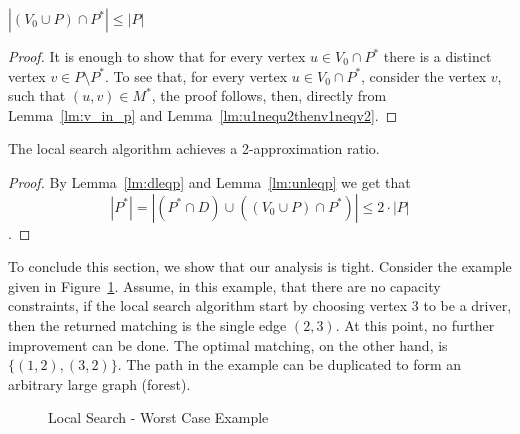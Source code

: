 \begin{lemma}
\label{lm:unleqp}
$|(V_0 \cup P) \cap P^*| \leq |P|$
\end{lemma}

\begin{proof}
It is enough to show that for every vertex $u \in V_0 \cap P^*$
there is a distinct vertex $v \in P \setminus P^*$.
To see that, for every vertex $u \in V_0 \cap P^*$, 
consider the vertex $v$, such that $(u, v) \in M^*$, 
the proof follows, then, directly
from Lemma~\ref{lm:v_in_p} and Lemma~\ref{lm:u1nequ2thenv1neqv2}.  
\end{proof}


\begin{theorem}
The local search algorithm achieves a 2-approximation ratio.
\end{theorem}

\begin{proof}
By Lemma~\ref{lm:dleqp} and Lemma~\ref{lm:unleqp} we get that 
$$
|P^*| = 
|(P^* \cap D) \cup ((V_0 \cup P) \cap P^*)| \leq 2 \cdot |P|
$$.
\end{proof}

To conclude this section, we show that our analysis is tight.
Consider the example given in Figure~\ref{fig:localtight}.
Assume, in this example, that there are no capacity constraints,
if the local search algorithm start by choosing vertex $3$ to be a driver, 
then the returned matching is the single edge $(2,3)$.
At this point, no further improvement can be done.
The optimal matching, on the other hand, is $\{(1, 2), (3, 2)\}$. 
The path in the example can be duplicated to form an arbitrary large graph (forest).

\begin{figure} 

\caption{
\label{fig:localtight}
Local Search - Worst Case Example
}
\end{figure}